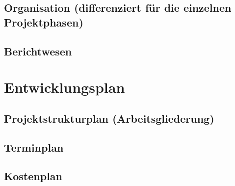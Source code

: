 \documentclass[a4paper,10pt]{scrartcl}
\begin{document}
\subsection{Organisation (differenziert für die einzelnen Projektphasen)}
\subsection{Berichtwesen}


\section{Entwicklungsplan}
\subsection{Projektstrukturplan (Arbeitsgliederung)}
\subsection{Terminplan}
\subsection{Kostenplan}
\end{document}

